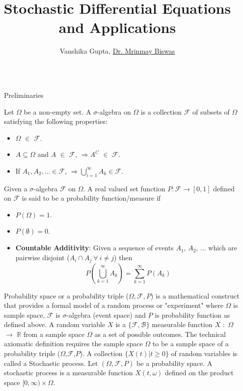 \documentclass[final]{beamer}
\title{Stochastic Differential Equations and Applications}
\author{Vanshika Gupta, \href{https://www.iitk.ac.in/new/mrinmay-biswas}{Dr. Mrinmay Biswas}}
\institute[shortinst]{\href{https://www.iitk.ac.in/math/}{Department of Mathematics and Statistics, Indian Institute of Technology Kanpur}}
\newlength{\sepwidth}
\newlength{\colwidth}
\newcommand{\separatorcolumn}{\begin{column}{\sepwidth}\end{column}}
\begin{document}
\begin{frame}[t]
\begin{columns}[t]
\separatorcolumn

\begin{column}{\colwidth}

  \begin{block}{Preliminaries}

       Let $\Omega$ be a non-empty set. A $\sigma$-algebra on $\Omega$ is a collection $\mathcal{F}$ of subsets of $\Omega$ satisfying the following properties:
      \begin{itemize}
          \item $\Omega$ $\in$ $\mathcal{F}$.
          \item $A \subseteq \Omega$ and $A$ $\in$ $\mathcal{F}$, $\Rightarrow A ^ C$  $\in$ $\mathcal{F}$.
          \item  If $A_1, A_2, \dots \in \mathcal{F}$, $ \Rightarrow \bigcup_{i=1}^{\infty} A_k \in \mathcal{F}$.
       \end{itemize}
          Given a $\sigma$-algebra $\mathcal{F}$ on $\Omega$. A real valued set function $P \colon \mathcal{F} \rightarrow [0,1]$ defined on $\mathcal{F}$ is said to be a probability function/measure if
       \begin{itemize}
         \item $P(\Omega) = 1$.
         \item $P(\emptyset) = 0$.
         \item  \textbf{Countable Additivity}:
       Given a sequence of events $A_1$, $A_2$, $\dots$ which are pairwise disjoint ($A_i \cap A_j \ \forall \ i \neq j$) then \[
     P\left(\bigcup_{k=1}^\infty A_k\right) = \sum_{k=1}^\infty P(A_k)
     \]
      \end{itemize}
         Probability space or a probability triple ($\Omega,\mathcal{F},P$) is a mathematical construct that provides a formal model of a random process or "experiment" where $\Omega$ is sample space, $\mathcal{F}$ is $\sigma$-algebra (event space) and $P$ is probability function as defined above.
          A random variable $X$ is a $\{\mathcal{F},\mathcal{B}\}$ measurable function $X$ $\colon$ $\Omega$ $\to$ $\mathbb{R}$ from a sample space $\Omega$  as a set of possible outcomes. The technical axiomatic definition requires the sample space $\Omega $ to be a sample space of a probability triple 
       ($\Omega$,$\mathcal{F}$,$P$).
         A collection $\{X(t) | t \geq 0\}$ of random variables is called a Stochastic process. Let $(\Omega, \mathcal{F}, P)$ be a probability space. A stochastic process is a measurable function $X(t, \omega)$ defined on the product space $[0,\infty) \times \Omega$.




\end{block}
\end{column}
\end{columns}
\end{frame}
\end{document}
